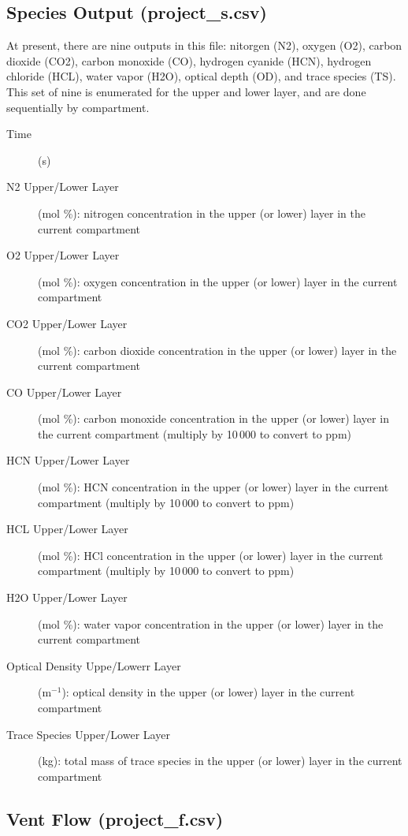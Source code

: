 \subsection{Species Output (project\_s.csv)}

At present, there are nine outputs in this file: nitorgen (N2), oxygen (O2), carbon dioxide (CO2), carbon monoxide (CO),  hydrogen cyanide (HCN), hydrogen chloride (HCL), water vapor (H2O), optical depth (OD), and trace species (TS). This set of nine is enumerated for the upper and lower layer, and are done sequentially by compartment.
\begin{description}
\item[Time] (s)
\item[N2 Upper/Lower Layer] (mol \%): nitrogen concentration in the upper (or lower) layer in the current compartment
\item[O2 Upper/Lower Layer] (mol \%): oxygen concentration in the upper (or lower) layer in the current compartment
\item[CO2 Upper/Lower Layer] (mol \%):  carbon dioxide concentration in the upper (or lower) layer in the current compartment
\item[CO Upper/Lower Layer] (mol \%):  carbon monoxide concentration in the upper (or lower) layer in the current compartment (multiply by 10\,000 to convert to ppm)
\item[HCN Upper/Lower Layer] (mol \%):  HCN concentration in the upper (or lower) layer in the current compartment (multiply by 10\,000 to convert to ppm)
\item[HCL Upper/Lower Layer] (mol \%):  HCl concentration in the upper (or lower) layer in the current compartment (multiply by 10\,000 to convert to ppm)
\item[H2O Upper/Lower Layer] (mol \%):  water vapor concentration in the upper (or lower) layer in the current compartment
\item[Optical Density Uppe/Lowerr Layer] (m$^{-1}$):  optical density in the upper (or lower) layer in the current compartment
\item[Trace Species Upper/Lower Layer] (kg):  total mass of trace species in the upper (or lower) layer in the current compartment
\end{description}

\subsection{Vent Flow (project\_f.csv)}

